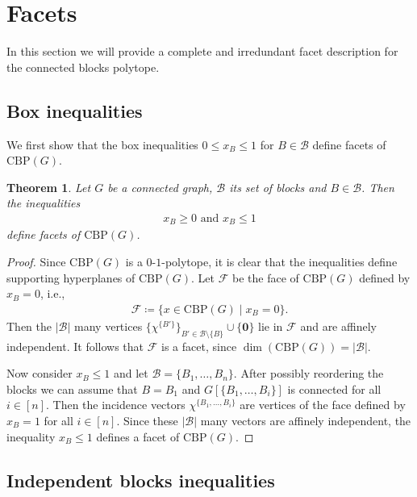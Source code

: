 \documentclass[12pt]{amsart}
\newtheorem{theorem}{Theorem}[section]
\newcommand{\CBP}{\mathrm{CBP}}
\newcommand{\B}{\mathcal{B}}
\newcommand{\F}{\mathcal{F}}
\begin{document}
\section{Facets}

\label{sectionFacets}

In this section we will provide a complete and irredundant facet description for the connected blocks polytope.

\subsection*{Box inequalities}

We first show that the box inequalities $0 \le x_B \le 1$ for $B \in \B$ define facets of $\CBP(G)$.

\begin{theorem}
    \label{theoremBox}
    Let $G$ be a connected graph, $\B$ its set of blocks and $B \in \B$. Then the inequalities
    \begin{align*}
        x_B \ge 0 \text{ and } x_B \le 1
    \end{align*}
    define facets of $\CBP(G)$.
\end{theorem}

\begin{proof}
    Since $\CBP(G)$ is a $0$-$1$-polytope, it is clear that the inequalities define supporting hyperplanes of $\CBP(G)$. Let $\mathcal{F}$ be the face of $\CBP(G)$ defined by $x_B=0$, i.e.,
    \begin{align*}
        \F \coloneqq \{x \in \CBP(G) \mid x_B=0 \}.
    \end{align*}
    Then the $\vert \B \vert$ many vertices $\{\chi^{\{B'\}}\}_{B' \in \B \setminus \{B\}} \cup \{\textbf{0}\}$ lie in $\F$ and are affinely independent. It follows that $\F$ is a facet, since $\dim(\CBP(G))=\vert \B \vert$.

    Now consider $x_B \le 1$ and let $\B=\{B_1,\ldots,B_n\}$. After possibly reordering the blocks we can assume that $B=B_1$ and $G[\{B_1,\ldots,B_i\}]$ is connected for all $i \in [n]$. Then the incidence vectors $\chi^{\{B_1,\ldots,B_i\}}$ are vertices of the face defined by $x_B=1$ for all $i \in [n]$. Since these $\vert \B \vert$ many vectors are affinely independent, the inequality $x_B \le 1$ defines a facet of $\CBP(G)$.
\end{proof}

\subsection*{Independent blocks inequalities}
\end{document}
